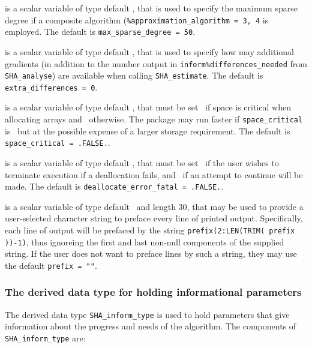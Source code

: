 \documentclass{galahad}
\newcommand{\packagename}{SHA}
\begin{document}
\begin{description}
 is a scalar variable of type default \integer, 
that is used to specify the maximum sparse degree if a composite algorithm
({\tt \%approximation\_algorithm = 3, 4} is employed.
The default is {\tt max\_sparse\_degree = 50}.

 is a scalar variable of type default \integer, 
that is used to specify how may additional gradients (in addition to the number
output in {\tt inform\%differences\_needed} from {\tt \packagename\_\-analyse})
are available when calling {\tt \packagename\_\-estimate}.
The default is {\tt extra\_differences = 0}.

 is a scalar variable of type default \logical, 
that must be set \true\ if space is critical when allocating arrays
and  \false\ otherwise. The package may run faster if 
{\tt space\_critical} is \false\ but at the possible expense of a larger
storage requirement. The default is {\tt space\_critical = .FALSE.}.

 is a scalar variable of type default \logical, 
that must be set \true\ if the user wishes to terminate execution if
a deallocation  fails, and \false\ if an attempt to continue
will be made. The default is {\tt deallocate\_error\_fatal = .FALSE.}.

 is a scalar variable of type default \character\
and length 30, that may be used to provide a user-selected 
character string to preface every line of printed output. 
Specifically, each line of output will be prefaced by the string 
{\tt prefix(2:LEN(TRIM( prefix ))-1)},
thus ignoreing the first and last non-null components of the
supplied string. If the user does not want to preface lines by such
a string, they may use the default {\tt prefix = ""}.

\end{description}


\subsubsection{The derived data type for holding informational
 parameters}\label{typeinform}
The derived data type 
{\tt \packagename\_inform\_type} 
is used to hold parameters that give information about the progress and needs 
of the algorithm. The components of 
{\tt \packagename\_inform\_type} 
are:
\end{document}
